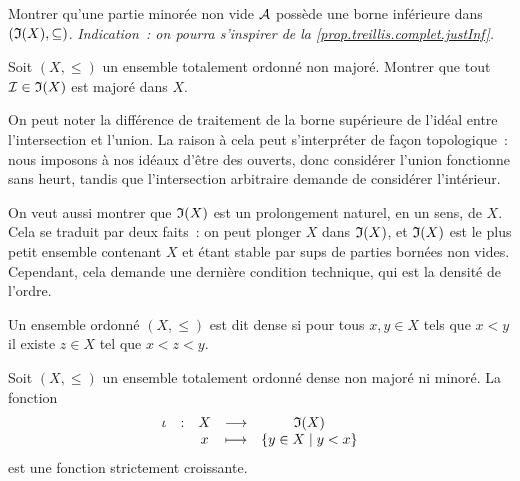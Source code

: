 \begin{exercise}
  Montrer qu'une partie minorée non vide $\mathcal A$ possède une borne inférieure
  dans $(\mathfrak{I}(X),\subseteq)$. \textit{Indication~: on pourra s'inspirer de
    la \cref{prop.treillis.complet.justInf}.}
\end{exercise}

\begin{exercise}\label{exo.ide.maj}
  Soit $(X,\leq)$ un ensemble totalement ordonné non majoré. Montrer que tout
  $\mathcal{I} \in \mathfrak{I}(X)$ est majoré dans $X$.
\end{exercise}

\begin{remark}
  On peut noter la différence de traitement de la borne supérieure de l'idéal
  entre l'intersection et l'union. La raison à cela peut s'interpréter de façon
  topologique~: nous imposons à nos idéaux d'être des ouverts, donc considérer
  l'union fonctionne sans heurt, tandis que l'intersection arbitraire demande
  de considérer l'intérieur.
\end{remark}

On veut aussi montrer que $\mathfrak{I}(X)$ est un prolongement naturel, en un sens,
de $X$. Cela se traduit par deux faits~: on peut plonger $X$ dans $\mathfrak{I}(X)$,
et $\mathfrak{I}(X)$ est le plus petit ensemble contenant $X$ et étant stable par
sups de parties bornées non vides. Cependant, cela demande une dernière
condition technique, qui est la densité de l'ordre.

\begin{definition}
  Un ensemble ordonné $(X,\leq)$ est dit dense si pour tous $x,y \in X$ tels
  que $x < y$ il existe $z\in X$ tel que $x < z < y$.
\end{definition}

\begin{proposition}
  Soit $(X,\leq)$ un ensemble totalement ordonné dense non majoré ni minoré. La
  fonction
  \[\makeFun{\iota}{X}{\ideal(X)}{x}{\compr{y \in X}{y < x}}\]
  est une fonction strictement croissante.
\end{proposition}


